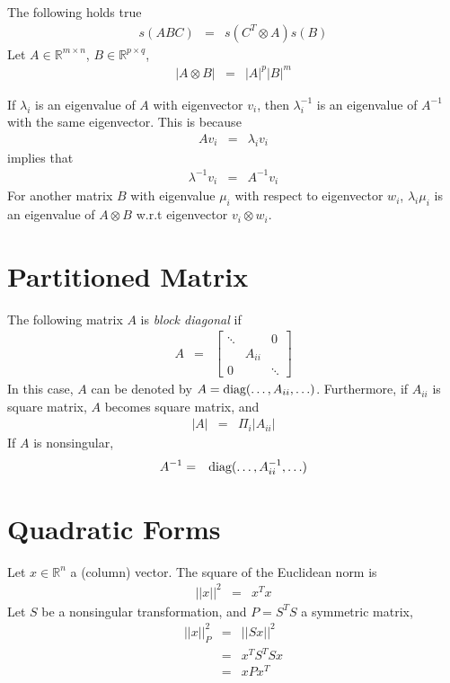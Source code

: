 The following holds true
\begin{eqnarray}
	s(ABC) &=& s(C^T\otimes A)s(B) \nonumber
\end{eqnarray}
Let $A\in\mathbb{R}^{m\times n}$, $B\in\mathbb{R}^{p\times q}$,
\begin{eqnarray}
	|A\otimes B| &=& |A|^p|B|^m \nonumber
\end{eqnarray}

If $\lambda_i$ is an eigenvalue of $A$ with eigenvector $v_i$, then $\lambda_i^{-1}$ is an eigenvalue of $A^{-1}$ with the same eigenvector. This is because
\begin{eqnarray}
	Av_i &=& \lambda_iv_i \nonumber
\end{eqnarray}
implies that
\begin{eqnarray}
	\lambda^{-1}v_i &=& A^{-1}v_i \nonumber
\end{eqnarray}
For another matrix $B$ with eigenvalue $\mu_i$ with respect to eigenvector $w_i$, $\lambda_i\mu_i$ is an eigenvalue of $A\otimes B$ w.r.t eigenvector $v_i\otimes w_i$.

\section{Partitioned Matrix}

The following matrix $A$ is \textit{block diagonal} if
\begin{eqnarray}
	A &=& \left[\begin{array}{ccc}
		\ddots &  & 0 \\
		 & A_{ii} &  \\
		0 &  & \ddots
	\end{array}\right] \nonumber
\end{eqnarray}
In this case, $A$ can be denoted by $A=\textup{diag}(\ldots, A_{ii}, \ldots)$. Furthermore, if $A_{ii}$ is square matrix, $A$ becomes square matrix, and
\begin{eqnarray}
	|A| &=& \Pi_{i}|A_{ii}| \nonumber
\end{eqnarray}
If $A$ is nonsingular,
\begin{eqnarray}
	A^{-1} &=& \textup{diag}(\ldots, A_{ii}^{-1}, \ldots) \nonumber
\end{eqnarray}

\section{Quadratic Forms}

Let $x\in\mathbb{R}^n$ a (column) vector. The square of the Euclidean norm is
\begin{eqnarray}
	||x||^2 &=& x^Tx \nonumber
\end{eqnarray}
Let $S$ be a nonsingular transformation, and $P=S^TS$ a symmetric matrix,
\begin{eqnarray}
	||x||_P^2 &=& ||Sx||^2 \nonumber \\
	&=& x^TS^TSx \nonumber \\
	&=& xPx^T \nonumber
\end{eqnarray}

